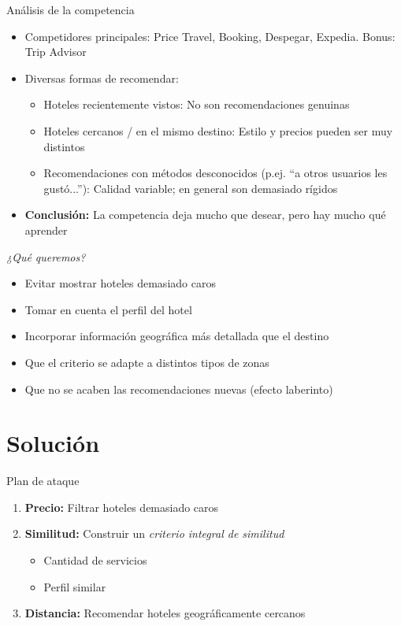\documentclass{beamer}
\begin{document}
\begin{frame}{Análisis de la competencia}
	\begin{itemize}%
		\item Competidores principales: Price Travel, Booking, Despegar, Expedia. Bonus: Trip Advisor
		\item Diversas formas de recomendar:
		\begin{itemize}
			\item Hoteles recientemente vistos: No son recomendaciones genuinas
			\item Hoteles cercanos / en el mismo destino: Estilo y precios pueden ser muy distintos
			\item Recomendaciones con métodos desconocidos (p.ej. ``a otros usuarios les gustó...''): Calidad variable; en general son demasiado rígidos
		\end{itemize}
	\item \textbf{Conclusión:} La competencia deja mucho que desear, pero hay mucho qué aprender
	\end{itemize}
\end{frame}

\begin{frame}{\textit{¿Qué queremos?}}
	\begin{itemize}%
		\item Evitar mostrar hoteles demasiado caros
		\item Tomar en cuenta el perfil del hotel
		\item Incorporar información geográfica más detallada que el destino
		\item Que el criterio se adapte a distintos tipos de zonas
		\item Que no se acaben las recomendaciones nuevas (efecto laberinto)
	\end{itemize}
\end{frame}

\section{Solución}

\begin{frame}{Plan de ataque}
	\begin{enumerate}%
		\item \textbf{Precio:} Filtrar hoteles demasiado caros
		\item \textbf{Similitud:} Construir un \textit{criterio integral de similitud}
		\begin{itemize}
			\item Cantidad de servicios
			\item Perfil similar
		\end{itemize}
		\item \textbf{Distancia:} Recomendar hoteles geográficamente cercanos
	\end{enumerate}
\end{frame}
\end{document}
